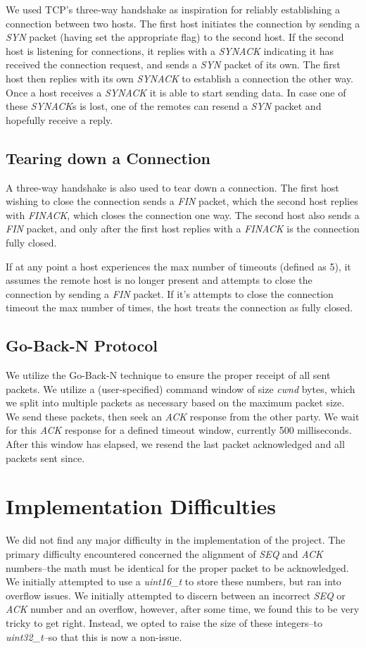 \documentclass[12pt]{article}
\begin{document}
We used TCP's three-way handshake as inspiration for reliably establishing a connection between two hosts. The first host initiates the connection by sending a \emph{SYN} packet (having set the appropriate flag) to the second host. If the second host is listening for connections, it replies with a \emph{SYNACK} indicating it has received the connection request, and sends a \emph{SYN} packet of its own. The first host then replies with its own \emph{SYNACK} to establish a connection the other way. Once a host receives a \emph{SYNACK} it is able to start sending data. In case one of these \emph{SYNACK}s is lost, one of the remotes can resend a \emph{SYN} packet and hopefully receive a reply.

\subsection{Tearing down a Connection}

A three-way handshake is also used to tear down a connection. The first host wishing to close the connection sends a \emph{FIN} packet, which the second host replies with \emph{FINACK}, which closes the connection one way. The second host also sends a \emph{FIN} packet, and only after the first host replies with a \emph{FINACK} is the connection fully closed.

If at any point a host experiences the max number of timeouts (defined as 5), it assumes the remote host is no longer present and attempts to close the connection by sending a \emph{FIN} packet. If it's attempts to close the connection timeout the max number of times, the host treats the connection as fully closed.

\subsection{Go-Back-N Protocol}

We utilize the Go-Back-N technique to ensure the proper receipt of all sent packets. We utilize a (user-specified) command window of size \emph{cwnd} bytes, which we split into multiple packets as necessary based on the maximum packet size. We send these packets, then seek an \emph{ACK} response from the other party. We wait for this \emph{ACK} response for a defined timeout window, currently 500 milliseconds. After this window has elapsed, we resend the last packet acknowledged and all packets sent since.

\section{Implementation Difficulties}
We did not find any major difficulty in the implementation of the project. The primary difficulty encountered concerned the alignment of \emph{SEQ} and \emph{ACK} numbers--the math must be identical for the proper packet to be acknowledged. We initially attempted to use a \emph{uint16\_t} to store these numbers, but ran into overflow issues. We initially attempted to discern between an incorrect \emph{SEQ} or \emph{ACK} number and an overflow, however, after some time, we found this to be very tricky to get right. Instead, we opted to raise the size of these integers--to \emph{uint32\_t}--so that this is now a non-issue.
\end{document}
